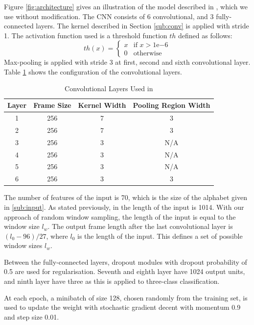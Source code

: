 Figure \ref{fig:architecture} gives an illustration of the model described in \citep{zhang2015character}, which we use without modification.
The CNN consists of 6 convolutional, and 3 fully-connected layers.
The kernel described in Section \ref{sub:conv} is applied with stride 1.
The activation function used is a threshold function $th$ defined as follows:
\[
  th(x) =
  \begin{cases}
    x & \text{if $x > 1\mathrm{e}{-6}$} \\
    0 & \text{otherwise}
  \end{cases}
\]
Max-pooling is applied with stride 3 at first, second and sixth convolutional layer.
Table \ref{tab:conv-config} shows the configuration of the convolutional layers.
\begin{table}[t]
\centering
\caption{Convolutional Layers Used in \citep{zhang2015character}}
\label{tab:conv-config}
\begin{tabular}{cccc}
Layer & Frame Size & Kernel Width & Pooling Region Width \\ \hline
1     & 256        & 7            & 3                    \\
2     & 256        & 7            & 3                    \\
3     & 256        & 3            & N/A                  \\
4     & 256        & 3            & N/A                  \\
5     & 256        & 3            & N/A                  \\
6     & 256        & 3            & 3                   
\end{tabular}
\end{table}
The number of features of the input is 70, which is the size of the alphabet given in \ref{sub:input}.
As stated previously, in \citep{zhang2015character} the length of the input is 1014.
With our approach of random window sampling, the length of the input is equal to the window size $l_w$.
The output frame length after the last convolutional layer is $(l_0 - 96) / 27$, where $l_0$ is the length of the input.
This defines a set of possible window sizes $l_w$.

Between the fully-connected layers, dropout modules \citep{hinton2012improving} with dropout probability of 0.5 are used for regularisation.
Seventh and eighth layer have 1024 output units, and ninth layer have three as this is applied to three-class classification.

At each epoch, a minibatch of size 128, chosen randomly from the training set, is used to update the weight with stochastic gradient decent \citep{polyak1964some} with momentum \citep{sutskever2013importance} 0.9 and step size 0.01.
